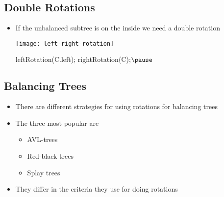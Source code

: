 \begin{slide}
\section{Double Rotations}

\begin{PauseHighLight}
  \begin{itemize}
  \item If the unbalanced subtree is on the inside we need a double
    rotation
    \begin{center}
      \texttt{[image: left-right-rotation]}\pause
    \end{center}
    \begin{java}
      leftRotation(C.left);
      rightRotation(C);$\pause$
    \end{java}
  \end{itemize}
\end{PauseHighLight}


\end{slide}


\Outline %

\begin{slide}
\section{Balancing Trees}

\begin{PauseHighLight}
  \begin{itemize}
  \item There are different strategies for using rotations for balancing
    trees\pause
  \item The three most popular are
    \begin{itemize}
    \item AVL-trees
    \item Red-black trees
    \item Splay trees\pause
    \end{itemize}
  \item They differ in the criteria they use for doing rotations\pause
  \end{itemize}
\end{PauseHighLight}

\end{slide}


